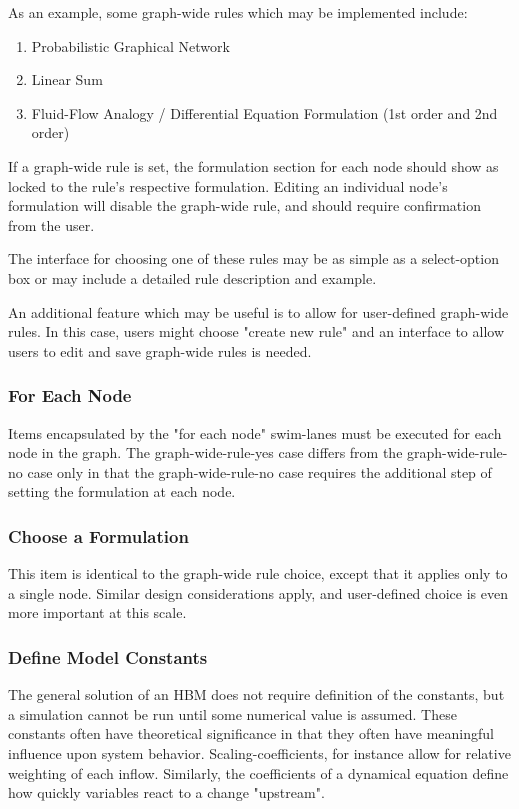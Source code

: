 \documentclass[conference]{IEEEtran}
\begin{document}
As an example, some graph-wide rules which may be implemented include:
\begin{enumerate}
  \item Probabilistic Graphical Network
  \item Linear Sum
  \item Fluid-Flow Analogy / Differential Equation Formulation (1st order and 2nd order)
\end{enumerate}

If a graph-wide rule is set, the formulation section for each node should show as locked to the rule's respective formulation. 
Editing an individual node's formulation will disable the graph-wide rule, and should require confirmation from the user. 

The interface for choosing one of these rules may be as simple as a select-option box or may include a detailed rule description and example. 

An additional feature which may be useful is to allow for user-defined graph-wide rules. 
In this case, users might choose "create new rule" and an interface to allow users to edit and save graph-wide rules is needed.

\subsubsection{For Each Node}

Items encapsulated by the "for each node" swim-lanes must be executed for each node in the graph. 
The graph-wide-rule-yes case differs from the graph-wide-rule-no case only in that the graph-wide-rule-no case requires the additional step of setting the formulation at each node.

\subsubsection{Choose a Formulation}
This item is identical to the graph-wide rule choice, except that it applies only to a single node. Similar design considerations apply, and user-defined choice is even more important at this scale.

\subsubsection{Define Model Constants}
The general solution of an HBM does not require definition of the constants, but a simulation cannot be run until some numerical value is assumed. 
These constants often have theoretical significance in that they often have meaningful influence upon system behavior. 
Scaling-coefficients, for instance allow for relative weighting of each inflow. 
Similarly, the coefficients of a dynamical equation define how quickly variables react to a change "upstream". 
\end{document}

